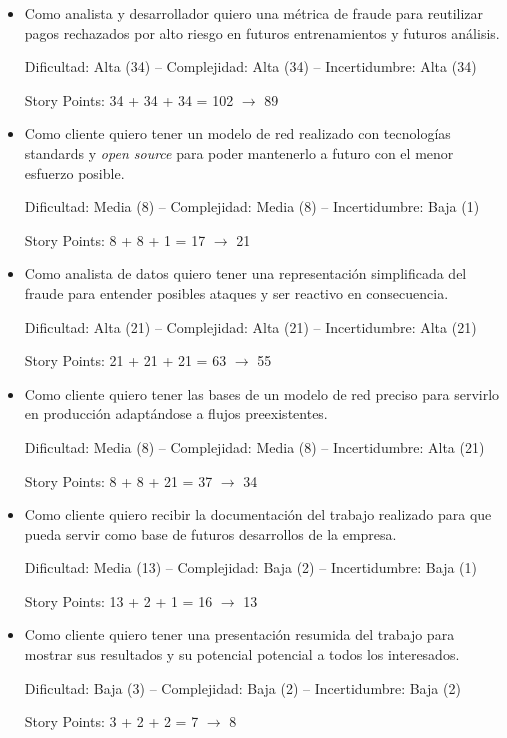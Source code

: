 \documentclass[
11pt, %
]{charter}
\begin{document}
\begin{itemize}
\item Como analista y desarrollador quiero una métrica de fraude para reutilizar pagos rechazados por alto riesgo en futuros entrenamientos y futuros análisis. 

Dificultad: Alta (34) -- Complejidad: Alta (34)  -- Incertidumbre: Alta (34)

Story Points: 34 + 34 + 34 = 102 $\rightarrow$ 89

\item Como cliente quiero tener un modelo de red realizado con tecnologías standards y \emph{open source} para poder mantenerlo a futuro con el menor esfuerzo posible.

Dificultad: Media (8) -- Complejidad: Media (8) -- Incertidumbre: Baja (1)

Story Points: 8 + 8 + 1 = 17 $\rightarrow$ 21

\item Como analista de datos quiero tener una representación simplificada del fraude para entender posibles ataques y ser reactivo en consecuencia.

Dificultad: Alta (21)  -- Complejidad: Alta (21) -- Incertidumbre: Alta (21)

Story Points: 21 + 21 + 21 = 63 $\rightarrow$  55

\item Como cliente quiero tener las bases de un modelo de red preciso para servirlo en producción adaptándose a flujos preexistentes.

Dificultad: Media (8) -- Complejidad: Media (8) -- Incertidumbre: Alta (21)

Story Points: 8 + 8 + 21 = 37 $\rightarrow$ 34

\item Como cliente quiero recibir la documentación del trabajo realizado para que pueda servir como base de futuros desarrollos de la empresa.

Dificultad: Media (13) -- Complejidad: Baja (2) -- Incertidumbre: Baja (1)

Story Points: 13 + 2 + 1 = 16 $\rightarrow$ 13

\item Como cliente quiero tener una presentación resumida del trabajo para mostrar sus resultados y su potencial potencial a todos los interesados.

Dificultad: Baja (3) -- Complejidad: Baja (2) -- Incertidumbre: Baja (2)

Story Points: 3 + 2 + 2 = 7 $\rightarrow$ 8


\end{itemize}
\end{document}
